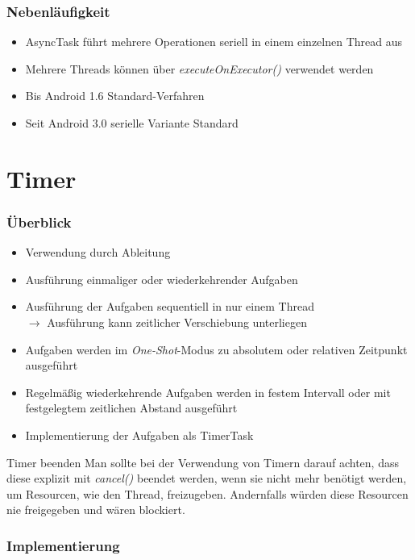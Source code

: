 \begin{frame}
   \frametitle{Nebenläufigkeit}
   \begin{itemize}
		\item AsyncTask führt mehrere Operationen seriell in einem einzelnen Thread aus
		\item Mehrere Threads können über \emph{executeOnExecutor()} verwendet werden
		\item Bis Android 1.6 Standard-Verfahren
		\item Seit Android 3.0 serielle Variante Standard
   \end{itemize}
\end{frame}

\section{Timer}
\begin{frame}
   \frametitle{Überblick}
   \begin{itemize}
     	\item Verwendung durch Ableitung
     	\item Ausführung einmaliger oder wiederkehrender Aufgaben
     	\item Ausführung der Aufgaben sequentiell in nur einem Thread\\
     		$\rightarrow$ Ausführung kann zeitlicher Verschiebung unterliegen
     	\item Aufgaben werden im \emph{One-Shot}-Modus zu absolutem 
     		oder relativen Zeitpunkt ausgeführt
     	\item Regelmäßig wiederkehrende Aufgaben werden in festem Intervall oder 
     		mit festgelegtem zeitlichen Abstand ausgeführt
     	\item Implementierung der Aufgaben als TimerTask
   \end{itemize}
   
   \begin{alertblock}{Timer beenden}
   	Man sollte bei der Verwendung von Timern darauf achten, dass diese 
		explizit mit \emph{cancel()} beendet werden, wenn sie nicht mehr benötigt werden, 
		um Resourcen, wie den Thread, freizugeben. Andernfalls würden diese Resourcen 
		nie freigegeben und wären blockiert.
   \end{alertblock}
\end{frame}

\begin{frame}
   \frametitle{Implementierung}
	
\end{frame}

